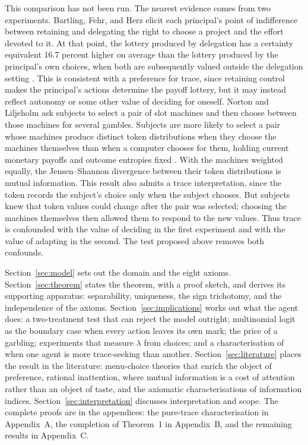 \documentclass[11pt,a4paper]{article}
\theoremstyle{definition}
\newcommand{\1}{\mathbf 1}
\begin{document}
This comparison has not been run.  The nearest evidence comes from two experiments.  Bartling, Fehr, and Herz
elicit each principal's point of indifference between retaining and delegating the right to choose a project and
the effort devoted to it.  At that point, the lottery produced by delegation has a certainty equivalent
16.7 percent higher on average than the lottery produced by the principal's own choices, when both are
subsequently valued outside the delegation setting \cite{BartlingFehrHerz2014}.  This is consistent with a
preference for trace, since retaining control makes the principal's actions determine the payoff lottery, but it
may instead reflect autonomy or some other value of deciding for oneself.  Norton and Liljeholm ask subjects to
select a pair of slot machines and then choose between those machines for several gambles.  Subjects are more
likely to select a pair whose machines produce distinct token distributions when they choose the machines
themselves than when a computer chooses for them, holding current monetary payoffs and outcome entropies fixed
\cite{NortonLiljeholm2020}.  With the machines weighted equally, the Jensen--Shannon divergence between their
token distributions is mutual information.  This result also admits a trace interpretation, since the token
records the subject's choice only when the subject chooses.  But subjects knew that token values could change
after the pair was selected; choosing the machines themselves then allowed them to respond to the new values.
Thus trace is confounded with the value of deciding in the first experiment and with the value of adapting in
the second.  The test proposed above removes both confounds.

Section~\ref{sec:model} sets out the domain and the eight axioms.  Section~\ref{sec:theorem} states the theorem,
with a proof sketch, and derives its supporting apparatus: separability, uniqueness, the sign trichotomy, and the
independence of the axioms.
Section~\ref{sec:implications} works out what the agent does: a two-treatment test that can reject the model
outright; multinomial logit as the boundary case when every action leaves its own mark; the price of a garbling;
experiments that measure $\lambda$ from choices; and a characterisation of when one agent is more trace-seeking
than another.
Section~\ref{sec:literature} places the result in the literature: menu-choice theories that enrich the object of
preference, rational inattention, where mutual information is a cost of attention rather than an object of
taste, and the axiomatic characterisations of information indices.
Section~\ref{sec:interpretation} discusses interpretation and scope.  The complete proofs are in the appendices:
the pure-trace characterisation in Appendix~A, the completion of Theorem~1 in Appendix~B, and the remaining
results in Appendix~C.
\end{document}
